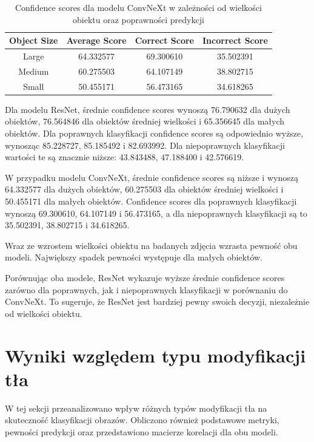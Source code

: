 \begin{table}
	\centering
	\begin{tabular}{|c|c|c|c|}
		\hline
		\textbf{Object Size} & \textbf{Average Score} & \textbf{Correct Score} & \textbf{Incorrect Score} \\
		\hline
		Large & 64.332577 & 69.300610 & 35.502391 \\
		\hline
		Medium & 60.275503 & 64.107149 & 38.802715 \\
		\hline
		Small & 50.455171 & 56.473165 & 34.618265 \\
		\hline
	\end{tabular}
	\caption{Confidence scores dla modelu ConvNeXt w zależności od wielkości obiektu oraz poprawności predykcji}
	\label{tab:convnext_confidence_scores}
\end{table}

Dla modelu ResNet, średnie confidence scores wynoszą 76.790632 dla dużych obiektów, 76.564846 dla obiektów średniej wielkości i 65.356645 dla małych obiektów. Dla poprawnych klasyfikacji confidence scores są odpowiednio wyższe, wynosząc 
85.228727, 85.185492 i 82.693992. Dla niepoprawnych klasyfikacji wartości te są znacznie niższe: 43.843488, 47.188400 i 42.576619.

W przypadku modelu ConvNeXt, średnie confidence scores są niższe i wynoszą 64.332577 dla dużych obiektów, 60.275503 dla obiektów średniej wielkości i 50.455171 dla małych obiektów. Confidence scores dla poprawnych klasyfikacji wynoszą 
69.300610, 64.107149 i 56.473165, a dla niepoprawnych klasyfikacji są to 35.502391, 38.802715 i 34.618265.

Wraz ze wzrostem wielkości obiektu na badanych zdjęcia wzrasta pewność obu modeli. Największy spadek pewności występuje dla małych obiektów.

Porównując oba modele, ResNet wykazuje wyższe średnie confidence scores zarówno dla poprawnych, jak i niepoprawnych klasyfikacji w porównaniu do ConvNeXt. To sugeruje, że ResNet jest bardziej pewny swoich decyzji, niezależnie od wielkości 
obiektu.

\section*{Wyniki względem typu modyfikacji tła}

W tej sekcji przeanalizowano wpływ różnych typów modyfikacji tła na skuteczność klasyfikacji obrazów. Obliczono również podstawowe metryki, pewności predykcji oraz przedstawiono macierze korelacji dla obu modeli. 

